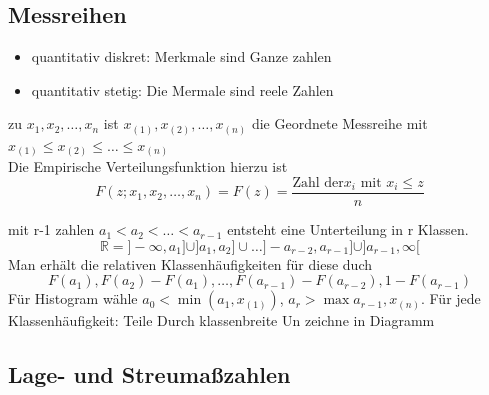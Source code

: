 \documentclass[
	ngerman,
	accentcolor=9c,%
	type=intern,
	marginpar=false
	]{tudapub}
\begin{document}
        \subsection{Messreihen}
            \begin{itemize}
                \item quantitativ diskret: Merkmale sind Ganze zahlen
                \item quantitativ stetig:  Die Mermale sind reele Zahlen
            \end{itemize}
            \begin{definition}
                zu $x_1,x_2,\dots,x_n$ ist $x_{(1)},x_{(2)},\dots,x_{(n)}$ die Geordnete Messreihe mit $x_{(1)} \leq x_{(2)}\leq \dots \leq x_{(n)}$\\
                Die Empirische Verteilungsfunktion hierzu ist
                \begin{equation*}
                    F(z;x_1,x_2,\dots,x_n)= F(z)=\dfrac{\text{Zahl der} x_i \text{ mit } x_i \leq z}{n} 
                \end{equation*}
            \end{definition}
            mit r-1 zahlen $a_1 < a_2 < \dots < a_{r-1}$ entsteht eine Unterteilung in r Klassen.
            \begin{equation*}
                \mathbb{R} = ] - \infty, a_1] \cup ] a_1, a_2] \cup \dots ] -a_{r-2}, a_{r-1}] \cup ] a_{r-1}, \infty[
            \end{equation*}
            Man erhält die relativen Klassenhäufigkeiten für diese duch
            \begin{equation*}
                F(a_1),F(a_2)-F(a_1), \dots, F(a_{r-1})-F(a_{r-2}), 1 - F(a_{r-1})
            \end{equation*}
            Für Histogram wähle $a_0 < \min (a_1, x_{(1)})$, $a_r > \max{a_{r-1}, x_{(n)}}$.
            Für jede Klassenhäufigkeit: Teile Durch klassenbreite Un zeichne in Diagramm\newpage
        \subsection{Lage- und Streumaßzahlen}
\end{document}
